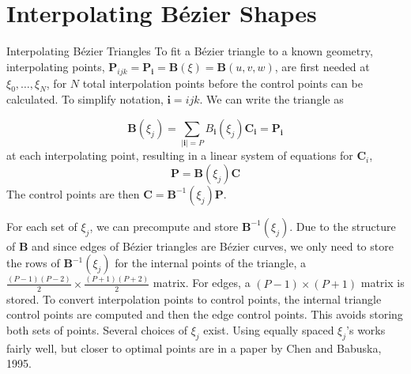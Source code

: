 \documentclass[12pt]{beamer}
\newcommand{\spa}{\vspace{0.5cm}\newline}
\begin{document}
\section{Interpolating B{\'e}zier Shapes}
\begin{frame}{Interpolating B{\'e}zier Triangles}
To fit a B{\'e}zier triangle to a known geometry, interpolating points, $\mathbf{P}_{ijk} =\mathbf{P}_{\mathbf{i}} = \mathbf{B}(\xi) =\mathbf{B}(u,v,w)$, are first needed at $\xi_0,\ldots, \xi_{N}$, for $N$ total interpolation points before the control points can be calculated. To simplify notation, $\mathbf{i} = ijk$. We can write the triangle as

\[
\mathbf{B}(\xi_j) = \displaystyle \sum_{|{\mathbf{i}| = P}} B_\mathbf{i}(\xi_j)\mathbf{C}_{\mathbf{i}} = \mathbf{P}_{\mathbf{i}}
\]
at each interpolating point, resulting in a linear system of equations for $\mathbf{C}_i$,
\[
\mathbf{P} = \mathbf{B}(\xi_j)\mathbf{C}
\]
The control points are then $\mathbf{C} = \mathbf{B}^{-1}(\xi_j)\mathbf{P}$. 
\end{frame}
\begin{frame}
For each set of $\xi_j$, we can precompute and store $\mathbf{B}^{-1}(\xi_j)$. Due to the structure of $\mathbf{B}$ and since edges of B{\'e}zier triangles are B{\'e}zier curves, we only need to store the rows of $\mathbf{B}^{-1}(\xi_j)$ for the internal points of the triangle, a $\frac{(P-1)(P-2)}{2} \times \frac{(P+1)(P+2)}{2}$ matrix. For edges, a $(P-1) \times (P+1)$ matrix is stored. \spa
To convert interpolation points to control points, the internal triangle control points are computed and then the edge control points. This avoids storing both sets of points. \spa
Several choices of $\xi_j$ exist. Using equally spaced $\xi_j$'s works fairly well, but closer to optimal points are in a paper by Chen and Babuska, 1995.
\end{frame}
\end{document}
